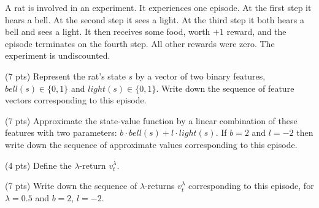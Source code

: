 \documentclass[12pt]{exam}
\newif\ifanswers
\begin{document}
\begin{question}{50}
A rat is involved in an experiment. It experiences one episode. At the
first step it hears a bell. At the second step it sees a light. At the
third step it both hears a bell and sees a light. It then receives
some food, worth $+1$ reward, and the episode terminates on the fourth
step. All other rewards were zero. The experiment is undiscounted.
  \vspace{\baselineskip}
\begin{subquestion} (7 pts)
Represent the rat’s state $s$ by a vector of two binary features, $bell(s) \in \{0, 1\}$ and
$light(s) \in \{0, 1\}$. Write down the sequence of feature vectors corresponding to this
episode.
  \begin{minipage}[t][1.5in]{\linewidth}
    \ifanswers
    Put answer here
    \fi
  \end{minipage}
\end{subquestion}
\begin{subquestion} (7 pts)
Approximate the state-value function by a linear combination of these
features with two parameters: $b \cdot bell(s) + l \cdot light(s)$. If
$b = 2$ and $l = -2$ then write down the sequence of approximate
values corresponding to this episode.
  \begin{minipage}[t][1.5in]{\linewidth}
    \ifanswers
    Put answer here
    \fi
  \end{minipage}
\end{subquestion}
\begin{subquestion} (4 pts)
 Define the $\lambda$-return $v^\lambda_t$.
  \begin{minipage}[t][1.5in]{\linewidth}
    \ifanswers
    Put answer here
    \fi
  \end{minipage}
\end{subquestion}
\begin{subquestion} (7 pts)
Write down the sequence of $\lambda$-returns $v^\lambda_t$
 corresponding to this episode, for $\lambda = 0.5$
 and $b = 2$, $l = -2$.
  \begin{minipage}[t][1.5in]{\linewidth}
    \ifanswers
    Put answer here
    \fi
  \end{minipage}
\end{subquestion}
\end{question}
\end{document}

